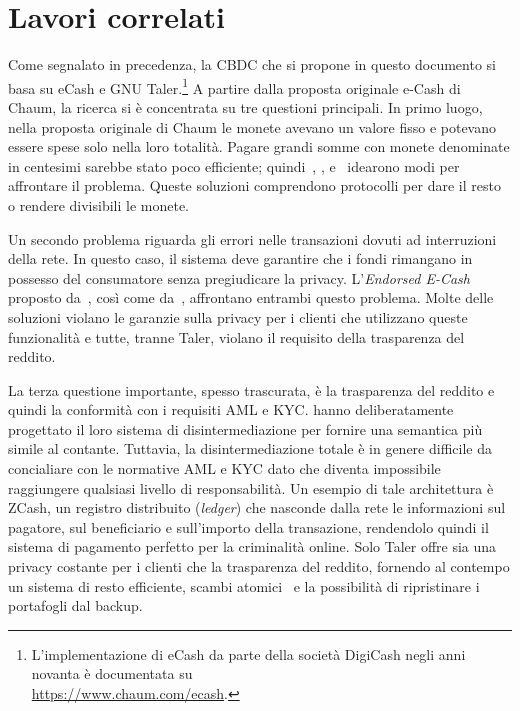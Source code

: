 \documentclass[a4paper]{article}
\begin{document}
\hypertarget{lavori-correlati}{%
\section{Lavori correlati}\label{6.-lavori-correlati}}

Come segnalato in precedenza, la CBDC che si propone in questo documento
si basa su eCash e GNU Taler.\footnote{L'implementazione di eCash
da parte della società DigiCash negli anni novanta è documentata su \\
\url{https://www.chaum.com/ecash}.} A partire dalla proposta originale
e-Cash di Chaum, la ricerca si è concentrata su tre questioni principali.
In primo luogo, nella proposta originale di Chaum le monete avevano un
valore fisso e potevano essere spese solo nella loro totalità. Pagare
grandi somme con monete denominate in centesimi sarebbe stato poco
efficiente; quindi~\cite{Okamoto}, \cite{Camenisch2005}, \cite{Canard}
e~\cite{Dold} idearono modi per affrontare il problema. Queste soluzioni
comprendono protocolli per dare il resto o rendere divisibili le monete.

Un secondo problema riguarda gli errori nelle transazioni dovuti ad
interruzioni della rete. In questo caso, il sistema deve garantire che
i fondi rimangano in possesso del consumatore senza pregiudicare la
privacy. L'\textit{Endorsed E-Cash} proposto da~\cite{Camenisch2007},
così come da~\cite{Dold}, affrontano entrambi questo problema. Molte
delle soluzioni violano le garanzie sulla privacy per i clienti che
utilizzano queste funzionalità e tutte, tranne Taler, violano il
requisito della trasparenza del reddito.

La terza questione importante, spesso trascurata, è la trasparenza del
reddito e quindi la conformità con i requisiti AML e KYC. \cite{Fuchsbauer}
hanno deliberatamente progettato il loro sistema di disintermediazione
per fornire una semantica più simile al contante. Tuttavia, la
disintermediazione totale è in genere difficile da concialiare con le
normative AML e KYC dato che diventa impossibile raggiungere qualsiasi
livello di responsabilità. Un esempio di tale architettura è ZCash, un
registro distribuito (\textit{ledger}) che nasconde dalla rete le
informazioni sul pagatore, sul beneficiario e sull'importo della
transazione, rendendolo quindi il sistema di pagamento perfetto per la
criminalità online. Solo Taler offre sia una privacy costante per i
clienti che la trasparenza del reddito, fornendo al contempo un sistema
di resto efficiente, scambi atomici~\cite[vedi][]{Camenisch2007} e la
possibilità di ripristinare i portafogli dal backup.
                                                       
\end{document}
